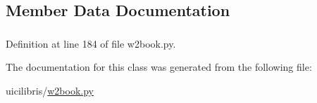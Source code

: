 \subsection{\-Member \-Data \-Documentation}
\hypertarget{classuicilibris_1_1w2book_1_1wiki2_ab1461398f11b498a73d850d22220fca4}{
\subsubsection[{state}]{}}\label{classuicilibris_1_1w2book_1_1wiki2_ab1461398f11b498a73d850d22220fca4}


\-Definition at line 184 of file w2book.\-py.



\-The documentation for this class was generated from the following file\-:\begin{DoxyCompactItemize}
\item 
uicilibris/\hyperlink{w2book_8py}{w2book.\-py}\end{DoxyCompactItemize}
